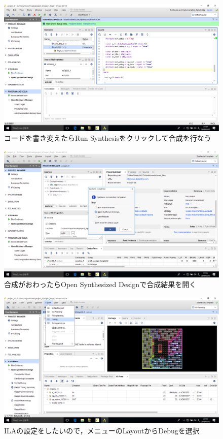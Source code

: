 \documentclass[a4paper,dvipdfmx]{jsarticle}
\begin{document}
 \begin{figure}[H]
  \begin{center}
   \includegraphics[width=.8\textwidth]{chapter08_figures/VirtualBox_Windows10_19_03_2018_23_52_03.png}
  \end{center}
  \caption{コードを書き変えたらRun Synthesisをクリックして合成を行なう}
 \end{figure}

 \begin{figure}[H]
  \begin{center}
   \includegraphics[width=.8\textwidth]{chapter08_figures/VirtualBox_Windows10_19_03_2018_23_55_12.png}
  \end{center}
  \caption{合成がおわったらOpen Synthesized Designで合成結果を開く}
 \end{figure}

 \begin{figure}[H]
  \begin{center}
   \includegraphics[width=.8\textwidth]{chapter08_figures/VirtualBox_Windows10_19_03_2018_23_55_41.png}
  \end{center}
  \caption{ILAの設定をしたいので，メニューのLayoutからDebugを選択}
 \end{figure}
\end{document}
